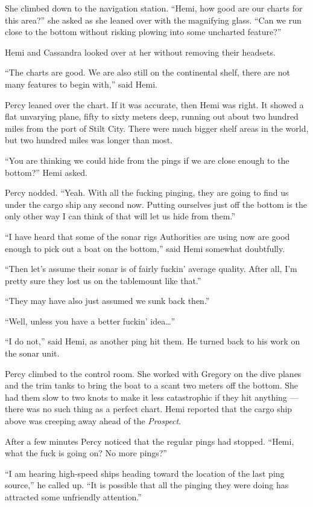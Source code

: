 \documentclass[
]{scrbook}
\begin{document}
She climbed down to the navigation station. ``Hemi, how good are our
charts for this area?'' she asked as she leaned over with the magnifying
glass. ``Can we run close to the bottom without risking plowing into
some uncharted feature?''

Hemi and Cassandra looked over at her without removing their headsets.

``The charts are good. We are also still on the continental shelf, there
are not many features to begin with,'' said Hemi.

Percy leaned over the chart. If it was accurate, then Hemi was right. It
showed a flat unvarying plane, fifty to sixty meters deep, running out
about two hundred miles from the port of Stilt City. There were much
bigger shelf areas in the world, but two hundred miles was longer than
most.

``You are thinking we could hide from the pings if we are close enough
to the bottom?'' Hemi asked.

Percy nodded. ``Yeah. With all the fucking pinging, they are going to
find us under the cargo ship any second now. Putting ourselves just off
the bottom is the only other way I can think of that will let us hide
from them.''

``I have heard that some of the sonar rigs Authorities are using now are
good enough to pick out a boat on the bottom,'' said Hemi somewhat
doubtfully.

``Then let's assume their sonar is of fairly fuckin' average quality.
After all, I'm pretty sure they lost us on the tablemount like that.''

``They may have also just assumed we sunk back then.''

``Well, unless you have a better fuckin' idea\ldots{}''

``I do not,'' said Hemi, as another ping hit them. He turned back to his
work on the sonar unit.

Percy climbed to the control room. She worked with Gregory on the dive
planes and the trim tanks to bring the boat to a scant two meters off
the bottom. She had them slow to two knots to make it less catastrophic
if they hit anything --- there was no such thing as a perfect chart.
Hemi reported that the cargo ship above was creeping away ahead of the
\emph{Prospect}.

After a few minutes Percy noticed that the regular pings had stopped.
``Hemi, what the fuck is going on? No more pings?''

``I am hearing high-speed ships heading toward the location of the last
ping source,'' he called up. ``It is possible that all the pinging they
were doing has attracted some unfriendly attention.''
\end{document}
